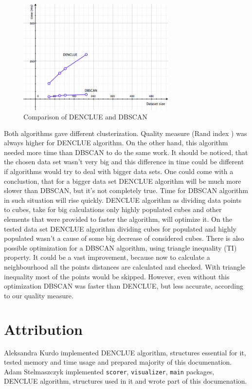 \documentclass[12pt, a4paper, notitlepage, oneside]{article}
\begin{document}
\begin{figure}[!ht]
 	\centering
	\includegraphics[width=0.7\textwidth]{images/comparison_time.png}
 	\caption[]
	{Comparison of DENCLUE and DBSCAN}
		\label{comparison_time}
\end{figure}

Both algorithms gave different clusterization.
Quality measure (Rand index \cite{rand}) was always higher for DENCLUE algorithm.
On the other hand, this algorithm needed more time than DBSCAN to do the same work. 
It should be noticed, that the chosen data set wasn't very big and this difference in time could be different if 
algorithms would try to deal with bigger data sets. 
One could come with a conclustion, that for a bigger data set DENCLUE algorithm will be much more slower 
than DBSCAN, but it's not completely true. 
Time for DBSCAN algorithm in such situation will rise quickly. 
DENCLUE algorithm as dividing data points to cubes, take for big calculations only highly populated cubes and other 
elements that were provided to faster the algorithm, will optimize it. 
On the tested data set DENCLUE algorithm dividing cubes for populated and 
highly populated wasn't a cause of some big decrease of considered cubes. 
There is also possible optimization for a DBSCAN algorithm, using triangle inequality (TI) property. \cite{mkr}
It could be a vast improvement, because now to calculate a neighbourhood all the points distances are calculated and checked.
With triangle inequality most of the points would be skipped. However, even without this optimization DBSCAN was faster
than DENCLUE, but less accurate, according to our quality measure.

\section{Attribution}

Aleksandra Kurdo implemented DENCLUE algorithm, structures essential for it, 
tested memory and time usage and prepared majority of this documenation.
Adam Stelmaszczyk implemented \texttt{scorer}, \texttt{visualizer}, \texttt{main} packages, 
DENCLUE algorithm, structures used in it and wrote part of this documenation.

\newpage



\end{document}
